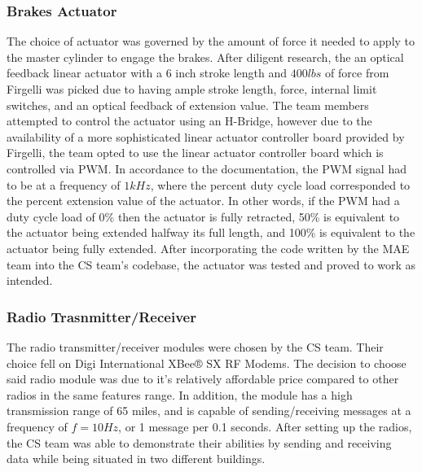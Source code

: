 
\subsubsection{Brakes Actuator}

\indent\indent The choice of actuator was governed by the amount of force it needed to apply to the master cylinder to engage the brakes. After diligent research, the an optical feedback linear actuator with a 6 inch stroke length and $400lbs$ of force from Firgelli was picked due to having ample stroke length, force, internal limit switches, and an optical feedback of extension value. The team members attempted to control the actuator using an H-Bridge, however due to the availability of a more sophisticated linear actuator controller board provided by Firgelli, the team opted to use the linear actuator controller board which is controlled via PWM. In accordance to the documentation, the PWM signal had to be at a frequency of $1kHz$, where the percent duty cycle load corresponded to the percent extension value of the actuator. In other words, if the PWM had a duty cycle load of 0\% then the actuator is fully retracted, 50\% is equivalent to the actuator being extended halfway its full length, and 100\% is equivalent to the actuator being fully extended. After incorporating the code written by the MAE team into the CS team's codebase, the actuator was tested and proved to work as intended.


\subsubsection{Radio Trasnmitter/Receiver}

\indent\indent The radio transmitter/receiver modules were chosen by the CS team. Their choice fell on Digi International XBee® SX RF Modems. The decision to choose said radio module was due to it's relatively affordable price compared to other radios in the same features range. In addition, the module has a high transmission range of 65 miles, and is capable of sending/receiving messages at a frequency of $f=10Hz$, or 1 message per 0.1 seconds. After setting up the radios, the CS team was able to demonstrate their abilities by sending and receiving data while being situated in two different buildings.